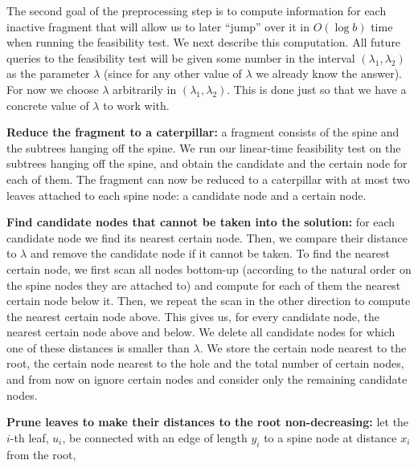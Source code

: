 \documentclass[11pt,a4paper]{article}
\newcounter{mycounter}
\newenvironment{noindlist}
 {\begin{list}{\arabic{mycounter}.~~}{\usecounter{mycounter} \labelsep=0em \labelwidth=0em \leftmargin=0em \itemindent=0em}}
 {\end{list}}
\theoremstyle{definition}
\theoremstyle{remark}
\begin{document}
The second goal of the preprocessing step is to
compute information for each inactive fragment that will allow us to later ``jump'' over it in $O(\log b)$ time when running the feasibility test.  We next describe this computation. All future queries to the feasibility test will be given some number in the interval $(\lambda_1,\lambda_2)$ as the parameter $\lambda$ (since for any other value of $\lambda$ we already know the answer). For now we choose $\lambda$ arbitrarily in
$(\lambda_1,\lambda_2)$. This is done just so that we have a concrete value of $\lambda$ to work with.%
\begin{noindlist}
\item\textbf{Reduce the fragment to a caterpillar:}
a fragment consists of the spine and the subtrees hanging off the spine. %
We run our linear-time feasibility test on the subtrees hanging off the spine, and obtain
the candidate and the certain node for each of them. The fragment can now be reduced to a caterpillar with at most two leaves attached to each
spine node: a candidate node and a certain node.
\item\label{removing certain nodes}
\textbf{Find candidate nodes that cannot be taken into the solution:}
for each candidate node we find its nearest certain node. Then, we compare their distance to $\lambda$ and remove the
candidate node if it cannot be taken. To find the nearest certain node, we first scan all nodes bottom-up (according to the natural order
on the spine nodes they are attached to) and compute for each of them the nearest certain node below it. Then, we repeat the scan
in the other direction to compute the nearest certain node above. This gives us, for every candidate node, the nearest certain node above
and below. We delete all candidate nodes for which one of these distances is smaller than $\lambda$.
We store the certain node nearest to the root, the certain node nearest to the hole and the total number of certain nodes,
and from now on ignore certain nodes and consider only the remaining candidate nodes.
\item\label{making distances from the root monotone}
\textbf{Prune leaves to make their distances to the root non-decreasing:}
let the $i$-th leaf, $u_{i}$, be connected with an edge of length $y_{i}$ to a spine node at distance $x_{i}$ from the root,

\end{noindlist}
\end{document}
